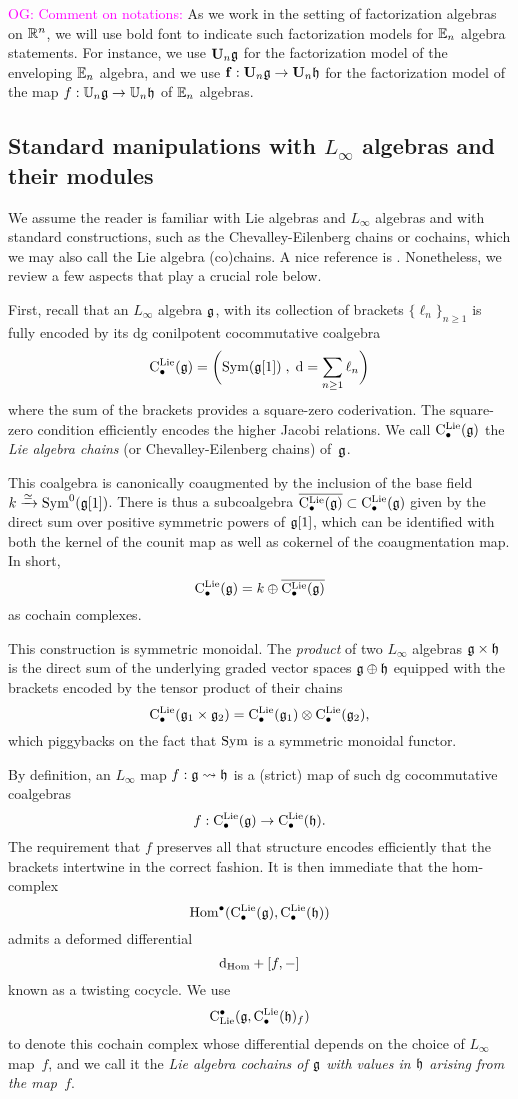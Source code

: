\documentclass[11pt]{amsart}
\numberwithin{equation}{section}
\def\owen{\textcolor{magenta}{OG: }\textcolor{magenta}}
\begin{document}
\owen{Comment on notations:}
As we work in the setting of factorization algebras on $\mathbb R^n$, 
we will use bold font to indicate such factorization models for $\mathbb E_n$ algebra statements.
For instance, we use $\mathbf U_n \mathfrak g$ for the factorization model of the enveloping $\mathbb E_n$ algebra,
and we use ${\bf f}: \mathbf U_n \mathfrak g \to \mathbf U_n \mathfrak h$ for the factorization model of the map $f: \mathbb U_n \mathfrak g \to \mathbb U_n \mathfrak h$ of $\mathbb E_n$ algebras.

\subsection{Standard manipulations with $L_\infty$ algebras and their modules}
\label{sec: review of linfty}

We assume the reader is familiar with Lie algebras and $L_\infty$ algebras and with standard constructions,
such as the Chevalley-Eilenberg chains or cochains, which we may also call the Lie algebra (co)chains.
A nice reference is \cite{LodayVallette}.
Nonetheless, we review a few aspects that play a crucial role below.

First, recall that an $L_\infty$ algebra $\mathfrak g$, with its collection of brackets $\{\ell_n\}_{n \geq 1}$ is fully encoded by its dg conilpotent cocommutative coalgebra
\[
{\rm C}^{\rm Lie}_\bullet(\mathfrak g) = \bigg({\rm Sym}(\mathfrak g[1]) \; , \; {\rm d} = \sum_{n \geq 1} \ell_n\bigg)
\]
where the sum of the brackets provides a square-zero coderivation.
The square-zero condition efficiently encodes the higher Jacobi relations.
We call ${\rm C}^{\rm Lie}_\bullet(\mathfrak g)$ the {\em Lie algebra chains} (or Chevalley-Eilenberg chains) of~$\mathfrak g$.

This coalgebra is canonically coaugmented by the inclusion of the base field $k \xrightarrow{\simeq} {\rm Sym}^0(\mathfrak g[1])$.
There is thus a subcoalgebra $\overline{{\rm C}^{\rm Lie}_\bullet(\mathfrak g)} \subset {\rm C}^{\rm Lie}_\bullet(\mathfrak g)$ given by the direct sum over positive symmetric powers of $\mathfrak g[1]$,
which can be identified with both the kernel of the counit map as well as cokernel of the coaugmentation map.
In short,
\[
{\rm C}^{\rm Lie}_\bullet(\mathfrak g) = k \oplus \overline{{\rm C}^{\rm Lie}_\bullet(\mathfrak g)}
\]
as cochain complexes.

This construction is symmetric monoidal.
The {\em product} of two $L_\infty$ algebras $\mathfrak g \times \mathfrak h$ is the direct sum of the underlying graded vector spaces $\mathfrak g \oplus \mathfrak h$ equipped with the brackets encoded by the tensor product of their chains
\[
{\rm C}^{\rm Lie}_\bullet(\mathfrak g_1 \times \mathfrak g_2) = {\rm C}^{\rm Lie}_\bullet(\mathfrak g_1) \otimes {\rm C}^{\rm Lie}_\bullet(\mathfrak g_2),
\]
which piggybacks on the fact that ${\rm Sym}$ is a symmetric monoidal functor.

By definition, an $L_\infty$ map $f: \mathfrak g \rightsquigarrow \mathfrak h$ is a (strict) map of such dg cocommutative coalgebras
\[
f: {\rm C}^{\rm Lie}_\bullet(\mathfrak g) \to {\rm C}^{\rm Lie}_\bullet(\mathfrak h).
\]
The requirement that $f$ preserves all that structure encodes efficiently that the brackets intertwine in the correct fashion.
It is then immediate that the hom-complex
\[
{\rm Hom}^\bullet ({\rm C}^{\rm Lie}_\bullet(\mathfrak g), {\rm C}^{\rm Lie}_\bullet(\mathfrak h))
\]
admits a deformed differential
\[
{\rm d}_{\rm Hom} + [f,-]
\]
known as a twisting cocycle.
We use 
\[
{\rm C}_{\rm Lie}^\bullet(\mathfrak g,{\rm C}^{\rm Lie}_\bullet(\mathfrak h)_f)
\]
to denote this cochain complex whose differential depends on the choice of $L_\infty$ map~$f$,
and we call it the {\em Lie algebra cochains of $\mathfrak g$ with values in $\mathfrak h$ arising from the map~$f$}.
\end{document}
